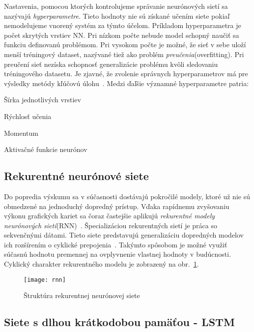 Nastavenia, pomocou ktorých kontrolujeme správanie neurónových sietí sa nazývajú \textit{hyperparametre}. Tieto hodnoty nie sú získané učením siete pokiaľ nemodelujeme vnorený systém za týmto účelom. Príkladom hyperparametra je počet skrytých vrstiev NN. Pri nízkom počte nebude model schopný naučiť sa funkciu definovanú problémom. Pri vysokom počte je možné, že sieť v sebe uloží menší tréningový dataset, nazývané tiež ako problém \textit{preučenia}(overfitting). Pri preučení sieť nezíska schopnosť generalizácie problému kvôli sledovaniu tréningového datasetu. Je zjavné, že zvolenie správnych hyperparametrov má pre výsledky metódy kľúčovú úlohu~\cite{Goodfellow-et-al-2016-Book}.
 Medzi ďaľšie významné hyperparametre patria:
\begin{my_itemize}
	\item {Šírka jednotlivých vrstiev}
	\item {Rýchlosť učenia}
	\item {Momentum}
	\item {Aktivačné funkcie neurónov}
\end{my_itemize}



\subsection{Rekurentné neurónové siete}
\label{analyza_pokrocile_modely_nn}

Do popredia výskumu sa v súčasnosti dostávajú pokročilé modely, ktoré už nie sú obmedzené na jednoduchý dopredný prístup. Vďaka rapídnemu zvyšovaniu výkonu grafických kariet sa čoraz častejšie aplikujú \textit{rekurentné modely neurónových sietí}(RNN)~\cite{jaeger2002tutorial}. Špecializáciou rekurentných sietí je práca so sekvenčnými dátami. Tieto siete predstavujú generalizáciu dopredných modelov ich rozšírením o cyklické prepojenia~\cite{Goodfellow-et-al-2016-Book}.
Takýmto spôsobom je možné využiť súčasnú hodnotu premennej na ovplyvnenie vlastnej hodnoty v budúcnosti. Cyklický charakter rekurentného modelu je zobrazený na obr.~\ref{fig:rnn}.

\begin{figure}[H]
\begin{center}\texttt{[image: rnn]}\end{center}
\caption[rnn]{Štruktúra rekurentnej neurónovej siete~\cite{jaeger2002tutorial}}\label{fig:rnn}
\end{figure}

\subsection{Siete s dlhou krátkodobou pamäťou - LSTM}


